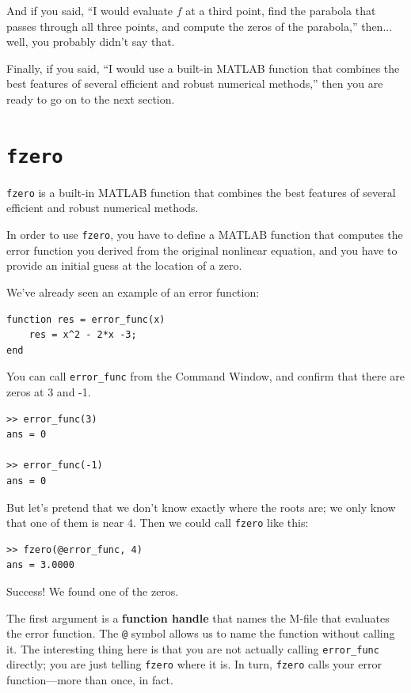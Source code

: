 \documentclass[
]{book}
\begin{document}
And if you said, ``I would evaluate $f$ at a third point, find the
parabola that passes through all three points, and compute the zeros
of the parabola,'' then... well, you probably didn't say that.

Finally, if you said, ``I would use a built-in MATLAB function that
combines the best features of several efficient and robust
numerical methods,'' then you are ready to go on to the next section.


\section{{\tt fzero}}
\label{sect:fzero}

{\tt fzero} is a built-in MATLAB function that
combines the best features of several efficient and robust
numerical methods.

In order to use {\tt fzero}, you have to define a MATLAB function
that computes the error function you derived from the original
nonlinear equation, and you have to provide an initial guess at
the location of a zero.

We've already seen an example of an error function:

\begin{verbatim}
function res = error_func(x)
    res = x^2 - 2*x -3;
end
\end{verbatim}

You can call {\tt error\_func} from the Command Window, and
confirm that there are zeros at 3 and -1.

\begin{verbatim}
>> error_func(3)
ans = 0

>> error_func(-1)
ans = 0
\end{verbatim}

But let's pretend that we don't know exactly where
the roots are; we only know that one of them is near 4.  Then
we could call {\tt fzero} like this:

\begin{verbatim}
>> fzero(@error_func, 4)
ans = 3.0000
\end{verbatim}

Success!  We found one of the zeros.

The first argument is a
{\bf function handle} that names the M-file that evaluates
the error function.  The {\tt @} symbol allows us to name the
function without calling it.  The interesting thing here is
that you are not actually calling {\tt error\_func} directly;
you are just telling {\tt fzero} where it is.  In turn, {\tt fzero}
calls your error function---more than once, in fact.
\end{document}
